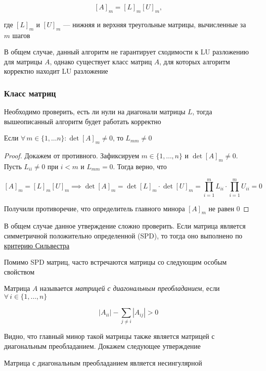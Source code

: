 \[[A]_m = [L]_m [U]_m,\]

где $[L]_m$ и $[U]_m$ --- нижняя и верхняя треугольные матрицы, вычисленные за $m$ шагов

В общем случае, данный алгоритм не гарантирует сходимости к LU разложению для матрицы $A$, однако существует класс матриц $A$, для которых алгоритм корректно находит LU разложение

\subsubsection*{Класс матриц}

Необходимо проверить, есть ли нули на диагонали матрицы $L$, тогда вышеописанный алгоритм будет работать корректно

\begin{claim}
    Если $\forall \, m \in \{1, \ldots n\}: \det [A]_m \neq 0$, то $L_{mm} \neq 0$
\end{claim}

\begin{proof}
    Докажем от противного. Зафиксируем $m \in \{1, \ldots, n\}$ и $\det [A]_m \neq 0$. Пусть $L_{ii} \neq 0$ при $i < m$ и $L_{mm} = 0$. Тогда верно, что

    \[
    [A]_m = [L]_m [U]_m \implies \det [A]_m = \det [L]_m \cdot \det [U]_m = \prod\limits_{i = 1}^m L_{ii} \cdot \prod\limits_{i = 1}^m U_{ii} = 0
    \]

    Получили противоречие, что определитель главного минора $[A]_m$ не равен $0$
\end{proof}

В общем случае данное утверждение сложно проверить. Если матрица является симметричной положительно определенной (SPD), то тогда оно выполнено по \href{https://en.wikipedia.org/wiki/Sylvester%27s_criterion}{критерию Сильвестра}

Помимо SPD матриц, часто встречаются матрицы со следующим особым свойством

\begin{definition}
    Матрица $A$ называется \textit{матрицей с диагональным преобладанием}, если $\forall \, i \in \{1, \ldots, n\}$

    \[
    |A_{ii}| - \sum\limits_{j \neq i} |A_{ij}| > 0
    \]
\end{definition}

Видно, что главный минор такой матрицы также является матрицей с диагональным преобладанием. Докажем следующее утверждение

\begin{claim}
    Матрица с диагональным преобладанием является несингулярной
\end{claim}

